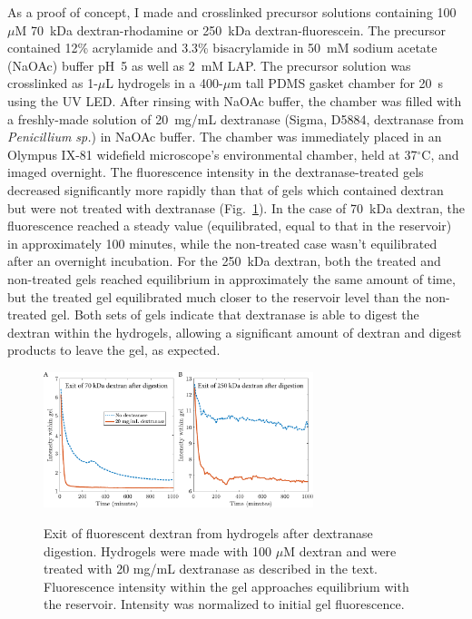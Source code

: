 As a proof of concept, I made and crosslinked precursor solutions containing 100~$\mu$M 70~kDa dextran-rhodamine or 250~kDa dextran-fluorescein.  The precursor contained 12\% acrylamide and 3.3\% bisacrylamide in 50~mM sodium acetate (NaOAc) buffer pH~5 as well as 2~mM LAP.  The precursor solution was crosslinked as 1-$\mu$L hydrogels in a 400-$\mu$m tall PDMS gasket chamber for 20~s using the UV LED.  After rinsing with NaOAc buffer, the chamber was filled with a freshly-made solution of 20~mg/mL dextranase (Sigma, D5884, dextranase from \textit{Penicillium sp.}) in NaOAc buffer.  The chamber was immediately placed in an Olympus IX-81 widefield microscope's environmental chamber, held at 37$^\circ$C, and imaged overnight. The fluorescence intensity in the dextranase-treated gels decreased significantly more rapidly than that of gels which contained dextran but were not treated with dextranase (Fig.~\ref{fig:dxase-equilibration}).  In the case of 70~kDa dextran, the fluorescence reached a steady value (equilibrated, equal to that in the reservoir) in approximately 100 minutes, while the non-treated case wasn't equilibrated after an overnight incubation.  For the 250~kDa dextran, both the treated and non-treated gels reached equilibrium in approximately the same amount of time, but the treated gel equilibrated much closer to the reservoir level than the non-treated gel.  Both sets of gels indicate that dextranase is able to digest the dextran within the hydrogels, allowing a significant amount of dextran and digest products to leave the gel, as expected.
\begin{figure}
\caption[Equilibration of hydrogels after digestion of dextran porogen.]{Exit of fluorescent dextran from hydrogels after dextranase digestion.  Hydrogels were made with 100 $\mu$M dextran and were treated with 20 mg/mL dextranase as described in the text.  Fluorescence intensity within the gel approaches equilibrium with the reservoir.  Intensity was normalized to initial gel fluorescence.}
\centering
\includegraphics[width=0.7\textwidth]{figs/ch03/dxase-equilibration}
\label{fig:dxase-equilibration}
\end{figure}

